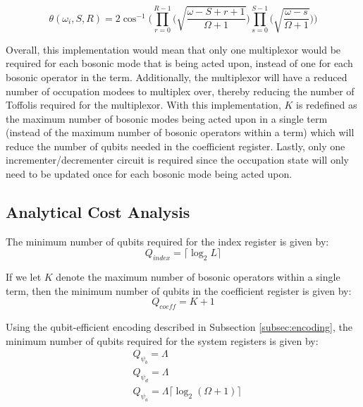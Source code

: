 \begin{tcolorbox}
    \begin{equation}
        \label{eq:smarter-rot-angle}
        \theta(\omega_i, S, R) = 2 \cos^{-1}{\Big(\prod_{r=0}^{R-1} \big( \sqrt{\frac{\omega - S + r + 1}{\Omega + 1}} \big) \prod_{s=0}^{S-1} \big( \sqrt{\frac{\omega - s}{\Omega + 1}} \big)\Big)}
    \end{equation}

    Overall, this implementation would mean that only one multiplexor would be required for each bosonic mode that is being acted upon, instead of one for each bosonic operator in the term.
    Additionally, the multiplexor will have a reduced number of occupation modees to multiplex over, thereby reducing the number of Toffolis required for the multiplexor.
    With this implementation, $K$ is redefined as the maximum number of bosonic modes being acted upon in a single term (instead of the maximum number of bosonic operators within a term) which will reduce the number of qubits needed in the coefficient register.
    Lastly, only one incrementer/decrementer circuit is required since the occupation state will only need to be updated once for each bosonic mode being acted upon.
\end{tcolorbox}

\subsection{Analytical Cost Analysis}
\label{subsec:analytics}

The minimum number of qubits required for the index register is given by:
\begin{equation}
    Q_{\textit{index}} = \lceil \log_2{L} \rceil
\end{equation}

If we let $K$ denote the maximum number of bosonic operators within a single term, then the minimum number of qubits in the coefficient register is given by:
\begin{equation}
    Q_{\textit{coeff}} = K + 1
\end{equation} 

Using the qubit-efficient encoding described in Subsection \ref{subsec:encoding}, the minimum number of qubits required for the system registers is given by:
\begin{equation}
    \begin{split}
        &Q_{\psi_b} = \Lambda \\
        &Q_{\psi_d} = \Lambda \\
        &Q_{\psi_a} = \Lambda \lceil \log_2{(\Omega + 1)} \rceil
    \end{split}
\end{equation} 

